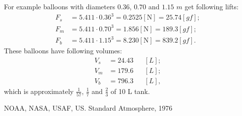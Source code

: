 \documentclass{article}
\begin{document}
For example balloons with diameters $\num{0.36}$, $\num{0.70}$ and $\num{1.15}$ $\si{m}$ get following lifts:
\begin{equation}
\begin{aligned}
F_s &= \num{5.411}\cdot\num{0.36}^3 = 0.2525 [\si{\newton}] = 25.74 [\si{gf}]; \\
F_m &= \num{5.411}\cdot\num{0.70}^3 = 1.856 [\si{\newton}] = 189.3 [\si{gf}]; \\
F_b &= \num{5.411}\cdot\num{1.15}^3 = 8.230 [\si{\newton}] = 839.2 [\si{gf}].
\end{aligned}
\end{equation}
These balloons have following volumes:
\begin{equation}
\begin{aligned}
V_s &= 24.43 && [\si{L}]; \\
V_m &= 179.6 && [\si{L}]; \\
V_b &= 796.3 && [\si{L}],
\end{aligned}
\end{equation}
which is approximately $\frac{1}{57}$, $\frac{1}{7}$ and $\frac{2}{3}$ of 10 L tank.
\begin{thebibliography}{9}
  NOAA, NASA, USAF,
  US. Standard Atmosphere,
  1976
\end{thebibliography}
\end{document}
